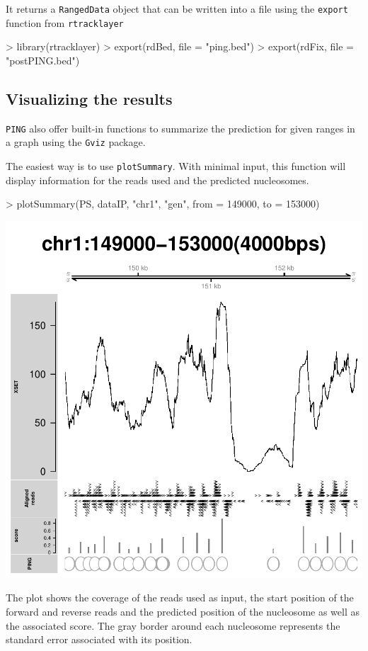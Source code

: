 \documentclass[11pt]{article}
\begin{document}
It returns a \texttt{RangedData} object that can be written into a file using
the \texttt{export} function from \texttt{rtracklayer}
\begin{Schunk}
\begin{Sinput}
> library(rtracklayer)
> export(rdBed, file = "ping.bed")
> export(rdFix, file = "postPING.bed")
\end{Sinput}
\end{Schunk}

\subsection{Visualizing the results}
\texttt{PING} also offer built-in functions to summarize the prediction for given ranges in a graph using the \texttt{Gviz} package.

The easiest way is to use \texttt{plotSummary}. With minimal input, this function will display information for the reads used and the predicted nucleosomes.
\begin{Schunk}
\begin{Sinput}
> plotSummary(PS, dataIP, "chr1", "gen", from = 149000, to = 153000)
\end{Sinput}
\end{Schunk}
\includegraphics{PING-plotSummary}

The plot shows the coverage of the reads used as input, the start position of the forward and reverse reads and the predicted position of the nucleosome as well as the associated score. The gray border around each nucleosome represents the standard error associated with its position.
\end{document}
